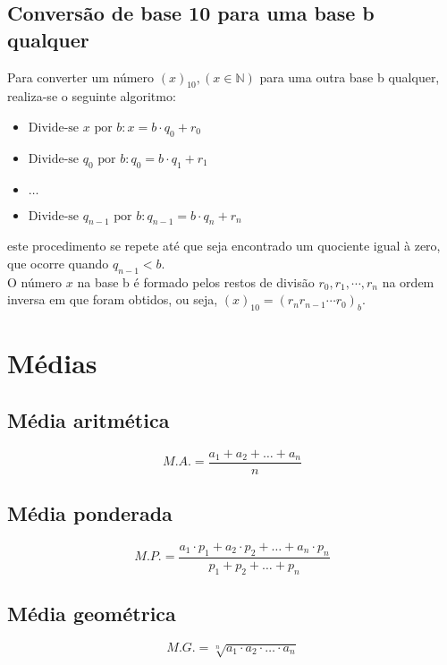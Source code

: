 \documentclass{article}
\begin{document}
\subsection{Conversão de base 10 para uma base b qualquer}
Para converter um número $(x)_{10}, (x\in\mathbb{N})$ para uma outra base b qualquer, realiza-se o seguinte algoritmo:
    \begin{itemize}
        \item $\text{Divide-se } x \text{ por }b: x=b\cdot q_0+r_0$
        \item $\text{Divide-se } q_0 \text{ por }b: q_0=b\cdot q_1+r_1$
        \item $\ldots$
        \item $\text{Divide-se } q_{n-1} \text{ por }b: q_{n-1}=b\cdot q_n+r_n$
    \end{itemize}
este procedimento se repete até que seja encontrado um quociente igual à zero, que ocorre quando $q_{n-1}<b$. \\
\indent O número $x$ na base b é formado pelos restos de divisão $r_0,r_1,\cdots,r_n$ na ordem inversa em que foram obtidos, ou seja, $(x)_{10}=(r_nr_{n-1}\cdots r_0)_b$.

\section{Médias}
\subsection{Média aritmética}
\begin{equation*}
    M.A.=\dfrac{a_1+a_2+\ldots+a_n}{n}
\end{equation*}

\subsection{Média ponderada}
\begin{equation*}
    M.P.=\dfrac{a_1\cdot p_1+a_2\cdot p_2+\ldots+a_n\cdot p_n}{p_1+p_2+\ldots+p_n}
\end{equation*}

\subsection{Média geométrica}
\begin{equation*}
    M.G.=\sqrt[n]{a_1\cdot a_2\cdot\ldots\cdot a_n}
\end{equation*}
\end{document}
